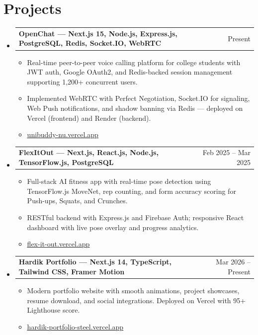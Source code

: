 \documentclass[letterpaper,10pt]{article}
\makeatletter
\newcommand{\resumeItem}[1]{
  \item\tiny{{#1 \vspace{-3pt}}}
}
\newcommand{\resumeProjectHeading}[2]{
    \item
    \begin{tabular*}{0.97\textwidth}{l@{\extracolsep{\fill}}r}
      \small\textbf{#1} & \tiny#2 \\
    \end{tabular*}\vspace{-7pt}
}
\newcommand{\resumeSubHeadingListStart}{\begin{itemize}[leftmargin=0.12in, label={}]}
\newcommand{\resumeSubHeadingListEnd}{\end{itemize}}
\newcommand{\resumeItemListStart}{\begin{itemize}[leftmargin=0.15in]}
\newcommand{\resumeItemListEnd}{\end{itemize}\vspace{-5pt}}
\makeatother
\begin{document}
\section{Projects}
\resumeSubHeadingListStart

    \resumeProjectHeading
      {\textbf{OpenChat} — Next.js 15, Node.js, Express.js, PostgreSQL, Redis, Socket.IO, WebRTC}{Present}
      \resumeItemListStart
        \resumeItem{Real-time peer-to-peer voice calling platform for college students with JWT auth, Google OAuth2, and Redis-backed session management supporting 1,200+ concurrent users.}
        \resumeItem{Implemented WebRTC with Perfect Negotiation, Socket.IO for signaling, Web Push notifications, and shadow banning via Redis — deployed on Vercel (frontend) and Render (backend).}
        \resumeItem{\href{https://unibuddy-nu.vercel.app/signup}{\underline{unibuddy-nu.vercel.app}}}
      \resumeItemListEnd

    \resumeProjectHeading
      {\textbf{FlexItOut} — Next.js, React.js, Node.js, TensorFlow.js, PostgreSQL}{Feb 2025 -- Mar 2025}
      \resumeItemListStart
        \resumeItem{Full-stack AI fitness app with real-time pose detection using TensorFlow.js MoveNet, rep counting, and form accuracy scoring for Push-ups, Squats, and Crunches.}
        \resumeItem{RESTful backend with Express.js and Firebase Auth; responsive React dashboard with live pose overlay and progress analytics.}
        \resumeItem{\href{https://flex-it-out-drab.vercel.app/}{\underline{flex-it-out.vercel.app}}}
      \resumeItemListEnd

    \resumeProjectHeading
      {\textbf{Hardik Portfolio} — Next.js 14, TypeScript, Tailwind CSS, Framer Motion}{Mar 2026 -- Present}
      \resumeItemListStart
        \resumeItem{Modern portfolio website with smooth animations, project showcases, resume download, and social integrations. Deployed on Vercel with 95+ Lighthouse score.}
        \resumeItem{\href{https://hardik-portfolio-steel.vercel.app/}{\underline{hardik-portfolio-steel.vercel.app}}}
      \resumeItemListEnd

\resumeSubHeadingListEnd
\end{document}
